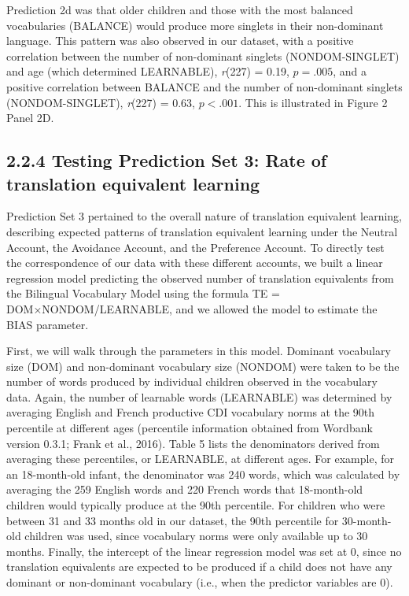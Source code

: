 \documentclass[
  english,
  ,man,floatsintext]{apa6}
\begin{document}
Prediction 2d was that older children and those with the most balanced vocabularies (BALANCE) would produce more singlets in their non-dominant language. This pattern was also observed in our dataset, with a positive correlation between the number of non-dominant singlets (NONDOM-SINGLET) and age (which determined LEARNABLE), \emph{r}(227) = 0.19, \(p = .005\), and a positive correlation between BALANCE and the number of non-dominant singlets (NONDOM-SINGLET), \emph{r}(227) = 0.63, \(p < .001\). This is illustrated in Figure 2 Panel 2D.

\hypertarget{testing-prediction-set-3-rate-of-translation-equivalent-learning}{%
\subsection{2.2.4 Testing Prediction Set 3: Rate of translation equivalent learning}\label{testing-prediction-set-3-rate-of-translation-equivalent-learning}}

Prediction Set 3 pertained to the overall nature of translation equivalent learning, describing expected patterns of translation equivalent learning under the Neutral Account, the Avoidance Account, and the Preference Account. To directly test the correspondence of our data with these different accounts, we built a linear regression model predicting the observed number of translation equivalents from the Bilingual Vocabulary Model using the formula TE = DOM×NONDOM/LEARNABLE, and we allowed the model to estimate the BIAS parameter.

First, we will walk through the parameters in this model. Dominant vocabulary size (DOM) and non-dominant vocabulary size (NONDOM) were taken to be the number of words produced by individual children observed in the vocabulary data. Again, the number of learnable words (LEARNABLE) was determined by averaging English and French productive CDI vocabulary norms at the 90th percentile at different ages (percentile information obtained from Wordbank version 0.3.1; Frank et al., 2016). Table 5 lists the denominators derived from averaging these percentiles, or LEARNABLE, at different ages. For example, for an 18-month-old infant, the denominator was 240 words, which was calculated by averaging the 259 English words and 220 French words that 18-month-old children would typically produce at the 90th percentile. For children who were between 31 and 33 months old in our dataset, the 90th percentile for 30-month-old children was used, since vocabulary norms were only available up to 30 months. Finally, the intercept of the linear regression model was set at 0, since no translation equivalents are expected to be produced if a child does not have any dominant or non-dominant vocabulary (i.e., when the predictor variables are 0).
\end{document}
